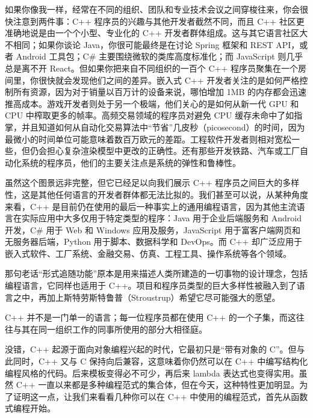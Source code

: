 如果你像我一样，经常在不同的组织、团队和专业技术会议之间穿梭往来，你会很快注意到两件事：C++ 程序员的兴趣与其他开发者截然不同，而且 C++ 社区更准确地说是由一个个小型、专业化的 C++ 开发者群体组成。这与其它语言社区大不相同；如果你谈论 Java，你很可能最终是在讨论 Spring 框架和 REST API，或者 Android 工具包；C\# 主要围绕微软的类库高度标准化；而 JavaScript 则几乎总是离不开 React。但如果你把来自不同组织的一百个 C++ 程序员聚集在一个房间里，你很快就会发现他们之间的差异。嵌入式 C++ 开发者关注的是如何严格控制所有资源，因为对于销量以百万计的设备来说，哪怕增加 1MB 的内存都会迅速推高成本。游戏开发者则处于另一个极端，他们关心的是如何从新一代 GPU 和 CPU 中榨取更多的帧率。高频交易领域的程序员对避免 CPU 缓存未命中了如指掌，并且知道如何从自动化交易算法中“节省”几皮秒（picosecond）的时间，因为最微小的时间单位可能意味着数百万欧元的差距。工程软件开发者则相对宽松一些，但仍会担心复杂渲染模型中更改的正确性。还有那些开发铁路、汽车或工厂自动化系统的程序员，他们的主要关注点是系统的弹性和鲁棒性。

虽然这个图景远非完整，但它已经足以向我们展示 C++ 程序员之间巨大的多样性，这是其他任何语言的开发者群体都无法比拟的。我们甚至可以说，从某种角度来看，C++ 是目前仍在使用的最后一种事实上的通用编程语言，因为其他主流语言在实际应用中大多仅用于特定类型的程序：Java 用于企业后端服务和 Android 开发，C\# 用于 Web 和 Windows 应用及服务，JavaScript 用于富客户端网页和无服务器后端，Python 用于脚本、数据科学和 DevOps。而 C++ 却广泛应用于嵌入式软件、工厂系统、金融交易、仿真、工程工具、操作系统等各个领域。

那句老话“形式追随功能”原本是用来描述人类所建造的一切事物的设计理念，包括编程语言，它同样也适用于 C++。项目和程序员类型的巨大多样性被融入到了语言之中，再加上斯特劳斯特鲁普（Stroustrup）希望它尽可能强大的愿望。

C++ 并不是一门单一的语言；每一位程序员都在使用 C++ 的一个子集，而这往往与其在同一组织工作的同事所使用的部分大相径庭。

没错，C++ 起源于面向对象编程兴起的时代，它最初只是“带有对象的 C”。但与此同时，C++ 又与 C 保持向后兼容，这意味着你仍然可以在 C++ 中编写结构化编程风格的代码。后来模板变得必不可少，再后来 lambda 表达式也变得实用。虽然 C++ 一直以来都是多种编程范式的集合体，但在今天，这种特性更加明显。为了证明这一点，让我们来看看几种你可以在 C++ 中使用的编程范式，首先从函数式编程开始。